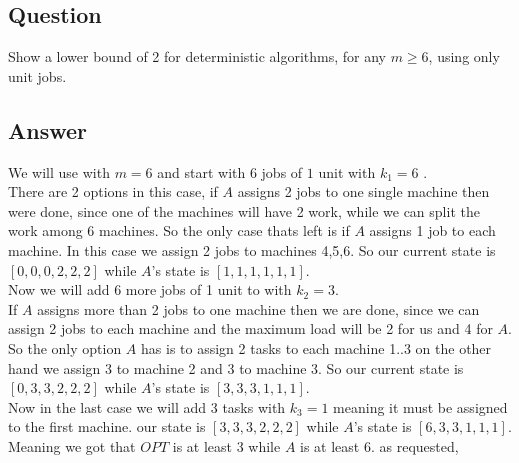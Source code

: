\subsection{Question}
Show a lower bound of 2 for deterministic algorithms, for any $m \geq 6$, using only unit jobs.

\subsection{Answer}
We will use with $m=6$ and start with $6$ jobs of $1$ unit with $k_{1}=6$ .\\
There are 2 options in this case, if $A$ assigns 2 jobs to one single machine then were done, since one of the machines will have 2 work, while we can split the work among 6 machines. So the only case thats left is if $A$ assigns 1 job to each machine. In this case we assign 2 jobs to machines 4,5,6. So our current state is $\left[0,0,0,2,2,2\right]$ while $A$'s state is $\left[1,1,1,1,1,1\right]$.\\
Now we will add 6 more jobs of 1 unit to with $k_2=3$.\\
If $A$ assigns more than 2 jobs to one machine then we are done, since we can assign 2 jobs to each machine and the maximum load will be 2 for us and 4 for $A$. So the only option $A$ has is to assign 2 tasks to each machine 1..3 on the other hand we assign 3 to machine 2 and 3 to machine 3. So our current state is $\left[0,3,3,2,2,2\right]$ while $A$'s state is $\left[3,3,3,1,1,1\right]$.\\
Now in the last case we will add 3 tasks with $k_3=1$ meaning it must be assigned to the first machine. our state is $\left[3,3,3,2,2,2\right]$ while $A$'s state is $\left[6,3,3,1,1,1\right]$.\\
Meaning we got that $OPT$ is at least 3 while $A$ is at least 6. as requested,\\ 